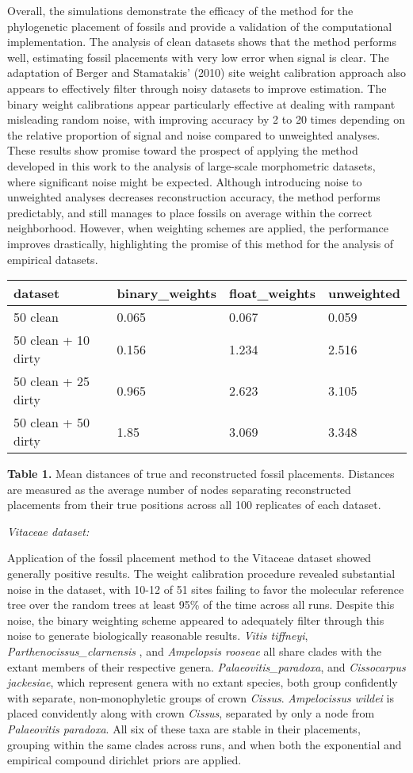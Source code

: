 \documentclass[12pt]{article}
\begin{document}
Overall, the simulations demonstrate the efficacy of the method for the
phylogenetic placement of fossils and provide a validation of the
computational implementation. The analysis of clean datasets shows that
the method performs well, estimating fossil placements with very low
error when signal is clear. The adaptation of Berger and Stamatakis'
(2010) site weight calibration approach also appears to effectively
filter through noisy datasets to improve estimation. The binary weight
calibrations appear particularly effective at dealing with rampant
misleading random noise, with improving accuracy by 2 to 20 times
depending on the relative proportion of signal and noise compared to
unweighted analyses. These results show promise toward the prospect of
applying the method developed in this work to the analysis of
large-scale morphometric datasets, where significant noise might be
expected. Although introducing noise to unweighted analyses decreases
reconstruction accuracy, the method performs predictably, and still
manages to place fossils on average within the correct neighborhood.
However, when weighting schemes are applied, the performance improves
drastically, highlighting the promise of this method for the analysis of
empirical datasets.

\begin{longtable}[]{@{}llll@{}}
\toprule
dataset & binary\_weights & float\_weights & unweighted\tabularnewline
\midrule
\endhead
50 clean & 0.065 & 0.067 & 0.059\tabularnewline
50 clean + 10 dirty & 0.156 & 1.234 & 2.516\tabularnewline
50 clean + 25 dirty & 0.965 & 2.623 & 3.105\tabularnewline
50 clean + 50 dirty & 1.85 & 3.069 & 3.348\tabularnewline
\bottomrule
\end{longtable}

\textbf{Table 1.} Mean distances of true and reconstructed fossil
placements. Distances are measured as the average number of nodes
separating reconstructed placements from their true positions across all
100 replicates of each dataset.

\noindent\emph{Vitaceae dataset:}

Application of the fossil placement method to the Vitaceae dataset
showed generally positive results. The weight calibration procedure
revealed substantial noise in the dataset, with 10-12 of 51 sites
failing to favor the molecular reference tree over the random trees at
least 95\% of the time across all runs. Despite this noise, the binary
weighting scheme appeared to adequately filter through this noise to
generate biologically reasonable results. \emph{Vitis tiffneyi},
\emph{Parthenocissus\_clarnensis} , and \emph{Ampelopsis rooseae} all
share clades with the extant members of their respective genera.
\emph{Palaeovitis\_paradoxa}, and \emph{Cissocarpus jackesiae}, which
represent genera with no extant species, both group confidently with
separate, non-monophyletic groups of crown \emph{Cissus}.
\emph{Ampelocissus wildei} is placed convidently along with crown
\emph{Cissus}, separated by only a node from \emph{Palaeovitis
paradoxa}. All six of these taxa are stable in their placements,
grouping within the same clades across runs, and when both the
exponential and empirical compound dirichlet priors are applied.
\end{document}
